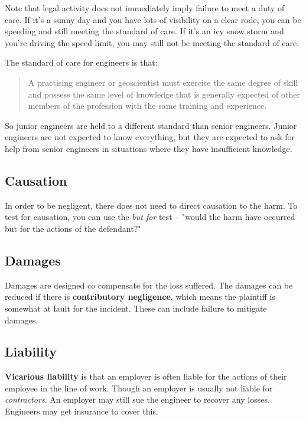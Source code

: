 \documentclass{article}
\begin{document}
Note that legal activity does not immediately imply failure to meet a duty of care. If it's a sunny day and you have lots of visibility on a clear rode, you can be speeding and still meeting the standard of care. If it's an icy snow storm and you're driving the speed limit, you may still not be meeting the standard of care.

The standard of care for engineers is that:

\begin{quote}
A practising engineer or
geoscientist must exercise the same degree of
skill and possess the same level of knowledge
that is generally expected of other members of
the profession with the same training and
experience.
\end{quote}

So junior engineers are held to a different standard than senior engineers. Junior engineers are not expected to know everything, but they are expected to ask for help from senior engineers in situations where they have insufficient knowledge.

\subsection{Causation}

In order to be negligent, there does not need to direct causation to the harm. To test for causation, you can use the \textit{but for} test -- "would the harm have occurred but for the actions of the defendant?"

\subsection{Damages}

Damages are designed co compensate for the loss suffered. The damages can be reduced if there is \textbf{contributory negligence}, which means the plaintiff is somewhat at fault for the incident. These can include failure to mitigate damages.

\subsection{Liability}

\textbf{Vicarious liability} is that an employer is often liable for the actions  of their employee in the line of work. Though an employer is usually not liable for \textit{contractors}. An employer may still sue the engineer to recover any losses. Engineers may get insurance to cover this.
\end{document}
